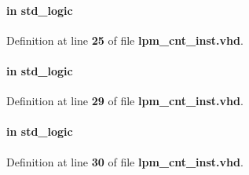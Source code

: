 \paragraph[{reset\+\_\+n}]{ {\bfseries \textcolor{keywordflow}{in}\textcolor{vhdlchar}{ }} {\bfseries \textcolor{comment}{std\+\_\+logic}\textcolor{vhdlchar}{ }} \hspace{0.3cm}{\ttfamily [Port]}}\label{classlpm__cnt__inst_a446ea52ed8c4a84181a47d9165ce41a5}


Definition at line {\bf 25} of file {\bf lpm\+\_\+cnt\+\_\+inst.\+vhd}.

\paragraph[{sclr}]{ {\bfseries \textcolor{keywordflow}{in}\textcolor{vhdlchar}{ }} {\bfseries \textcolor{comment}{std\+\_\+logic}\textcolor{vhdlchar}{ }} \hspace{0.3cm}{\ttfamily [Port]}}\label{classlpm__cnt__inst_a12175d404278bb7c9a33ab7bb2552b29}


Definition at line {\bf 29} of file {\bf lpm\+\_\+cnt\+\_\+inst.\+vhd}.

\paragraph[{sload}]{ {\bfseries \textcolor{keywordflow}{in}\textcolor{vhdlchar}{ }} {\bfseries \textcolor{comment}{std\+\_\+logic}\textcolor{vhdlchar}{ }} \hspace{0.3cm}{\ttfamily [Port]}}\label{classlpm__cnt__inst_ae466da6a7da5cd14e469ffdccea7070e}


Definition at line {\bf 30} of file {\bf lpm\+\_\+cnt\+\_\+inst.\+vhd}.

\paragraph[{std\+\_\+logic\+\_\+1164}]{\hspace{0.3cm}{\ttfamily [Package]}}\label{classlpm__cnt__inst_acd03516902501cd1c7296a98e22c6fcb}



